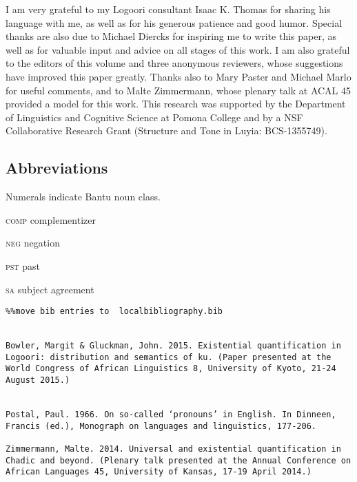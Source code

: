 \documentclass[output=paper]{langsci/langscibook}
\begin{document}
I am very grateful to my Logoori consultant Isaac K. Thomas for sharing his language with me, as well as for his generous patience and good humor. Special thanks are also due to Michael Diercks for inspiring me to write this paper, as well as for valuable input and advice on all stages of this work. I am also grateful to the editors of this volume and three anonymous reviewers, whose suggestions have improved this paper greatly. Thanks also to Mary Paster and Michael Marlo for useful comments, and to Malte Zimmermann, whose plenary talk at ACAL 45 provided a model for this work. This research was supported by the Department of Linguistics and Cognitive Science at Pomona College and by a NSF Collaborative Research Grant (Structure and Tone in Luyia: BCS-1355749).

\subsection*{Abbreviations}

Numerals indicate Bantu noun class.

\textsc{comp}  complementizer

\textsc{neg}  negation

\textsc{pst}  past

\textsc{sa}  subject agreement


\begin{verbatim}%%move bib entries to  localbibliography.bib


Bowler, Margit & Gluckman, John. 2015. Existential quantification in Logoori: distribution and semantics of ku. (Paper presented at the World Congress of African Linguistics 8, University of Kyoto, 21-24 August 2015.)


Postal, Paul. 1966. On so-called ‘pronouns’ in English. In Dinneen, Francis (ed.), Monograph on languages and linguistics, 177-206.

Zimmermann, Malte. 2014. Universal and existential quantification in Chadic and beyond. (Plenary talk presented at the Annual Conference on African Languages 45, University of Kansas, 17-19 April 2014.)


\end{verbatim}
 

\printbibliography[heading=subbibliography,notkeyword=this]
\end{document}
